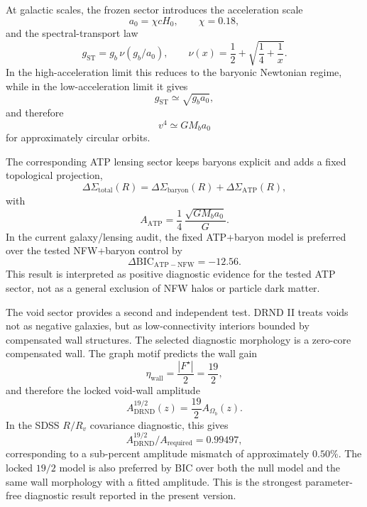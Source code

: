 \documentclass[12pt]{iopart}
\begin{document}
At galactic scales, the frozen sector introduces the acceleration scale
\begin{equation}
a_0=\chi cH_0,
\qquad
\chi=0.18,
\end{equation}
and the spectral-transport law
\begin{equation}
g_{\mathrm{ST}}
=
g_b\,\nu(g_b/a_0),
\qquad
\nu(x)
=
\frac12+\sqrt{\frac14+\frac1x}.
\end{equation}
In the high-acceleration limit this reduces to the baryonic Newtonian regime, while in the low-acceleration limit it gives
\begin{equation}
g_{\mathrm{ST}}\simeq \sqrt{g_ba_0},
\end{equation}
and therefore
\begin{equation}
v^4\simeq GM_ba_0
\end{equation}
for approximately circular orbits.

The corresponding ATP lensing sector keeps baryons explicit and adds a fixed topological projection,
\begin{equation}
\Delta\Sigma_{\mathrm{total}}(R)
=
\Delta\Sigma_{\mathrm{baryon}}(R)
+
\Delta\Sigma_{\mathrm{ATP}}(R),
\end{equation}
with
\begin{equation}
A_{\mathrm{ATP}}
=
\frac14\,\frac{\sqrt{GM_ba_0}}{G}.
\end{equation}
In the current galaxy/lensing audit, the fixed ATP+baryon model is preferred over the tested NFW+baryon control by
\begin{equation}
\Delta\mathrm{BIC}_{\mathrm{ATP-NFW}}=-12.56.
\end{equation}
This result is interpreted as positive diagnostic evidence for the tested ATP sector, not as a general exclusion of NFW halos or particle dark matter.

The void sector provides a second and independent test. DRND II treats voids not as negative galaxies, but as low-connectivity interiors bounded by compensated wall structures. The selected diagnostic morphology is a zero-core compensated wall. The graph motif predicts the wall gain
\begin{equation}
\eta_{\mathrm{wall}}
=
\frac{|F^\star|}{2}
=
\frac{19}{2},
\end{equation}
and therefore the locked void-wall amplitude
\begin{equation}
A_{\mathrm{DRND}}^{19/2}(z)
=
\frac{19}{2}A_{\Omega_b}(z).
\end{equation}
In the SDSS \(R/R_v\) covariance diagnostic, this gives
\begin{equation}
A_{\mathrm{DRND}}^{19/2}/A_{\mathrm{required}}
=
0.99497,
\end{equation}
corresponding to a sub-percent amplitude mismatch of approximately \(0.50\%\). The locked \(19/2\) model is also preferred by BIC over both the null model and the same wall morphology with a fitted amplitude. This is the strongest parameter-free diagnostic result reported in the present version.
\end{document}
